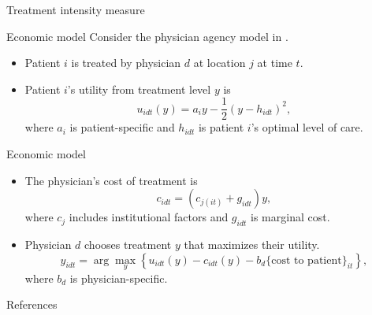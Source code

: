 \documentclass[10pt,aspectratio=169]{beamer}
\begin{document}
\begin{frame}{Treatment intensity measure} \label{intensity}

    \hyperlink{rq}{}
\end{frame}

\begin{frame}{Economic model} \label{model}
    \vspace{2.5mm}
    Consider the physician agency model in \textcite{badinski_geographic_2023}.
        \begin{itemize}
            \item Patient $i$ is treated by physician $d$ at location $j$ at time $t$. 
            \item Patient $i$'s utility from treatment level $y$ is  
                \begin{equation*}
                    u_{idt}(y) = a_i y - \frac{1}{2}(y-h_{idt})^2,
                \end{equation*}
            where $a_i$ is patient-specific and $h_{idt}$ is patient $i$'s optimal level of care. 
        \end{itemize}
\end{frame}

\begin{frame}{Economic model}
        \begin{itemize}
            \item The physician's cost of treatment is 
                \begin{equation*}
                    c_{idt} = (c_{j(it)} + g_{idt})y, 
                \end{equation*}
            where $c_{j}$ includes institutional factors and $g_{idt}$ is marginal cost.
            \item Physician $d$ chooses treatment $y$ that maximizes their utility.  
                \begin{equation*}
                    y_{idt} = \arg\max_y \left\{u_{idt}(y) - c_{idt}(y) - b_d \{\text{cost to patient}\}_{it}\right\}, 
                \end{equation*}
            where $b_d$ is physician-specific. 
        \end{itemize}

    \hyperlink{rq}{}
\end{frame}

\nocite{*}

\begin{frame}[allowframebreaks]{References}
    \printbibliography[heading=none]
\end{frame}
\end{document}
